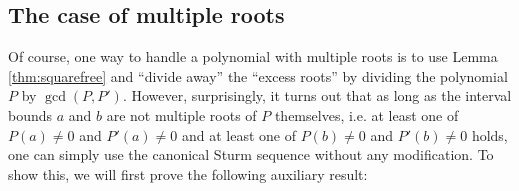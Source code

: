 \documentclass[11pt,a4paper,oneside]{article}
\newcommand{\RR}{\mathbb{R}}
\newcommand{\ie}{i.\,e.\xspace}
\begin{document}


\subsection{The case of multiple roots}

Of course, one way to handle a polynomial with multiple roots is to use Lemma \ref{thm:squarefree} and \enquote{divide away} the \enquote{excess roots} by dividing the polynomial $P$ by $\gcd(P,P')$. However, surprisingly, it turns out that as long as the interval bounds $a$ and $b$ are not multiple roots of $P$ themselves, i.e. at least one of $P(a)\neq 0$ and $P'(a)\neq 0$ and at least one of $P(b)\neq 0$ and $P'(b)\neq 0$ holds, one can simply use the canonical Sturm sequence without any modification. To show this, we will first prove the following auxiliary result:
\end{document}
